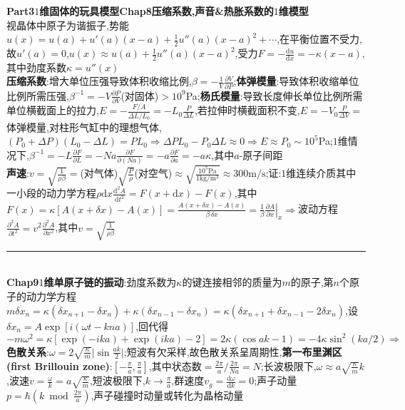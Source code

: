 \documentclass[UTF8,10pt,a4paper]{article}
\providecommand{\abs}[1]{\lvert#1\rvert}
\begin{document}
\begin{multicols}{2}
\textbf{Part3$1$维固体的玩具模型Chap8压缩系数,声音\&热胀系数的$1$维模型}\\
视晶体中原子为谐振子,势能$u(x)=u(a)+u'(a)(x-a)+\frac{1}{2}u''(a)(x-a)^2+\cdots$,在平衡位置不受力,故$u'(a)=0$,$u(x)\approx u(a)+\frac{1}{2}u''(a)(x-a)^2$,受力$F=-\frac{\mathrm{d}u}{\mathrm{d}x}=-\kappa(x-a)$,其中劲度系数$\kappa=u''(x)$\\
\textbf{压缩系数}:增大单位压强导致体积收缩比例,$\beta=-\frac{1}{V}\frac{\partial V}{\partial P}$;\textbf{体弹模量}:导致体积收缩单位比例所需压强,$\beta^{-1}=-V\frac{\partial P}{\partial V}$(对固体)$>10^9$Pa;\textbf{杨氏模量}:导致长度伸长单位比例所需单位横截面上的拉力,$E=-\frac{F/A}{\Delta L/L_0}=-L_0\frac{P}{\Delta L}$,若拉伸时横截面积不变,$E=-V_0\frac{P}{\Delta V}=$体弹模量,对柱形气缸中的理想气体,$(P_0+\Delta P)(L_0-\Delta L)=PL_0\Rightarrow\Delta PL_0-P_0\Delta L\approx 0\Rightarrow E\approx P_0\sim 10^5$Pa;$1$维情况下,$\beta^{-1}=-L\frac{\partial F}{\partial L}=-Na\frac{\partial F}{\partial(Na)}=-a\frac{\partial F}{\partial a}=-a\kappa$,其中$a$-原子间距\\
\textbf{声速}:$v=\sqrt{\frac{1}{\rho\beta}}=$(对气体)$\sqrt{\frac{P}{\rho}}$(对空气)$\approx\sqrt{\frac{10^5\text{Pa}}{1\text{kg}/\text{m}^3}}\approx 300\text{m}/\text{s}$;证:$1$维连续介质其中一小段的动力学方程$\rho\mathrm{d}x\frac{\mathrm{d}^2A}{\mathrm{d}t^2}=F(x+\mathrm{d}x)-F(x)$,其中$F(x)=\kappa[A(x+\delta x)-A(x)]=\frac{A(x+\delta x)-A(x)}{\beta\,\delta x}=\frac{1}{\beta}\left.\frac{\partial A}{\partial x}\right\rvert_x\Rightarrow$波动方程$\frac{\partial^2A}{\partial t^2}=v^2\frac{\partial^2A}{\partial x^2}$,其中$v=\sqrt{\frac{1}{\rho\beta}}$\\
\rule{\columnwidth}{.2pt}\\
\textbf{Chap9$1$维单原子链的振动}:劲度系数为$\kappa$的键连接相邻的质量为$m$的原子,第$n$个原子的动力学方程$m\ddot{\delta x_n}=\kappa(\delta x_{n+1}-\delta x_n)+\kappa(\delta x_{n-1}-\delta x_n)=\kappa(\delta x_{n+1}+\delta x_{n-1}-2\delta x_n)$,设$\delta x_n=A\exp[i(\omega t-kna)]$,回代得$-m\omega^2=\kappa[\exp(-ika)+\exp(ika)-2]=2\kappa(\cos ak-1)=-4\kappa\sin^2(ka/2)\Rightarrow$\textbf{色散关系}:$\omega=2\sqrt{\frac{\kappa}{m}}\abs{\sin\frac{ak}{2}}$;短波有欠采样,故色散关系呈周期性,\textbf{第一布里渊区(first Brillouin zone)}:$[-\frac{\pi}{a},\frac{\pi}{a}]$,其中状态数$=\frac{2\pi}{a}/\frac{2\pi}{Na}=N$;长波极限下,$\omega\approx a\sqrt{\frac{\kappa}{m}}k$,波速$v=\frac{\omega}{k}=a\sqrt{\frac{\kappa}{m}}$,短波极限下,$k\rightarrow\frac{\pi}{a}$,群速度$v_g=\frac{\mathrm{d}\omega}{\mathrm{d}k}=0$;声子动量$p=\hbar(k\bmod\frac{2\pi}{a})$,声子碰撞时动量或转化为晶格动量\\

\end{multicols}
\end{document}
